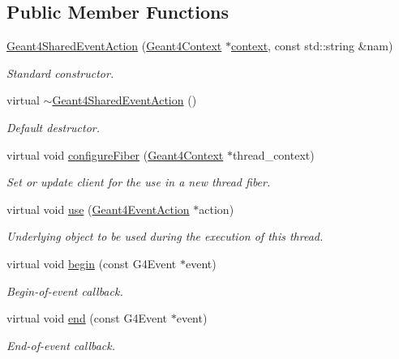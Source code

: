 \subsection*{Public Member Functions}
\begin{DoxyCompactItemize}
\item 
\hyperlink{class_d_d4hep_1_1_simulation_1_1_geant4_shared_event_action_a81782b16c36081abd74eb6a0bed051c6}{Geant4\+Shared\+Event\+Action} (\hyperlink{class_d_d4hep_1_1_simulation_1_1_geant4_context}{Geant4\+Context} $\ast$\hyperlink{class_d_d4hep_1_1_simulation_1_1_geant4_action_aa9d87f0ec2a72b7fc2591b18f98d75cf}{context}, const std\+::string \&nam)
\begin{DoxyCompactList}\small\item\em Standard constructor. \end{DoxyCompactList}\item 
virtual \hyperlink{class_d_d4hep_1_1_simulation_1_1_geant4_shared_event_action_a094e353ce282d06dac18c5752c078c63}{$\sim$\+Geant4\+Shared\+Event\+Action} ()
\begin{DoxyCompactList}\small\item\em Default destructor. \end{DoxyCompactList}\item 
virtual void \hyperlink{class_d_d4hep_1_1_simulation_1_1_geant4_shared_event_action_a7933d545b7caacaca3928b3af1038df6}{configure\+Fiber} (\hyperlink{class_d_d4hep_1_1_simulation_1_1_geant4_context}{Geant4\+Context} $\ast$thread\+\_\+context)
\begin{DoxyCompactList}\small\item\em Set or update client for the use in a new thread fiber. \end{DoxyCompactList}\item 
virtual void \hyperlink{class_d_d4hep_1_1_simulation_1_1_geant4_shared_event_action_a1b553e6983d3ce8bb3a84f660216175b}{use} (\hyperlink{class_d_d4hep_1_1_simulation_1_1_geant4_event_action}{Geant4\+Event\+Action} $\ast$action)
\begin{DoxyCompactList}\small\item\em Underlying object to be used during the execution of this thread. \end{DoxyCompactList}\item 
virtual void \hyperlink{class_d_d4hep_1_1_simulation_1_1_geant4_shared_event_action_a64b5998713b09c32de56774b1d69f64d}{begin} (const G4\+Event $\ast$event)
\begin{DoxyCompactList}\small\item\em Begin-\/of-\/event callback. \end{DoxyCompactList}\item 
virtual void \hyperlink{class_d_d4hep_1_1_simulation_1_1_geant4_shared_event_action_a207f1882eece3c87364b38b266bd9935}{end} (const G4\+Event $\ast$event)
\begin{DoxyCompactList}\small\item\em End-\/of-\/event callback. \end{DoxyCompactList}\end{DoxyCompactItemize}
